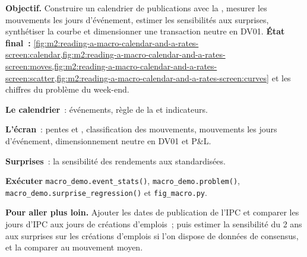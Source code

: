 \begin{tutorial}
\textbf{Objectif.} Construire un calendrier de publications avec la , mesurer les mouvements les jours d'événement,
estimer les sensibilités aux surprises, synthétiser la courbe et dimensionner une transaction neutre en DV01.
\textbf{État final~:} \cref{fig:m2:reading-a-macro-calendar-and-a-rates-screen:calendar,fig:m2:reading-a-macro-calendar-and-a-rates-screen:moves,fig:m2:reading-a-macro-calendar-and-a-rates-screen:scatter,fig:m2:reading-a-macro-calendar-and-a-rates-screen:curves}
et les chiffres du problème du week-end.
\begin{tutsteps}
\item \textbf{Le calendrier}~: événements, règle de la  et indicateurs.
\label{lst:m2:reading-a-macro-calendar-and-a-rates-screen:cal}
\item \textbf{L'écran}~: pentes et , classification des mouvements, mouvements les jours d'événement,
dimensionnement neutre en DV01 et P\&L.
\label{lst:m2:reading-a-macro-calendar-and-a-rates-screen:screen}
\item \textbf{Surprises}~: la sensibilité des rendements aux  standardisées.
\label{lst:m2:reading-a-macro-calendar-and-a-rates-screen:sens}
\item \textbf{Exécuter} \texttt{macro\_demo.event\_stats()}, \texttt{macro\_demo.problem()},
\texttt{macro\_demo.surprise\_regression()} et \texttt{fig\_macro.py}.
\end{tutsteps}
\textbf{Pour aller plus loin.} Ajouter les dates de publication de l'IPC et comparer les jours d'IPC aux jours de créations d'emplois~;
puis estimer la sensibilité du 2 ans aux surprises sur les créations d'emplois si l'on dispose de données de consensus,
et la comparer au mouvement moyen.
\end{tutorial}

